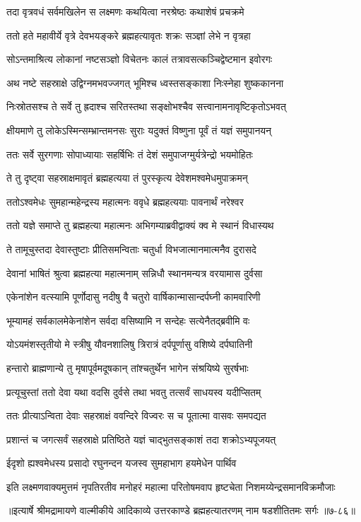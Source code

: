 
\twolineshloka
{तदा वृत्रवधं सर्वमखिलेन स लक्ष्मणः}
{कथयित्वा नरश्रेष्ठः कथाशेषं प्रचक्रमे} %

\twolineshloka
{ततो हते महावीर्ये वृत्रे देवभयङ्करे}
{ब्रह्महत्यावृतः शक्रः सञ्ज्ञां लेभे न वृत्रहा} %

\twolineshloka
{सोऽन्तमाश्रित्य लोकानां नष्टसञ्ज्ञो विचेतनः}
{कालं तत्रावसत्कञ्चिद्वेष्टमान इवोरगः} %

\twolineshloka
{अथ नष्टे सहस्राक्षे उद्विग्नमभवज्जगत्}
{भूमिश्च ध्वस्तसङ्काशा निःस्नेहा शुष्ककानना} %

\twolineshloka
{निःस्रोतसश्च ते सर्वे तु ह्रदाश्च सरितस्तथा}
{सङ्क्षोभश्चैव सत्त्वानामनावृष्टिकृतोऽभवत्} %

\twolineshloka
{क्षीयमाणे तु लोकेऽस्मिन्सम्भ्रान्तमनसः सुराः}
{यदुक्तं विष्णुना पूर्वं तं यज्ञं समुपानयन्} %

\twolineshloka
{ततः सर्वे सुरगणाः सोपाध्यायाः सहर्षिभिः}
{तं देशं समुपाजग्मुर्यत्रेन्द्रो भयमोहितः} %

\twolineshloka
{ते तु दृष्ट्वा सहस्राक्षमावृतं ब्रह्महत्यया}
{तं पुरस्कृत्य देवेशमश्वमेधमुपाक्रमन्} %

\twolineshloka
{ततोऽश्वमेधः सुमहान्महेन्द्रस्य महात्मनः}
{ववृधे ब्रह्महत्ययाः पावनार्थं नरेश्वर} %

\twolineshloka
{ततो यज्ञे समाप्ते तु ब्रह्महत्या महात्मनः}
{अभिगम्याब्रवीद्वाक्यं क्व मे स्थानं विधास्यथ} %

\twolineshloka
{ते तामूचुस्तदा देवास्तुष्टाः प्रीतिसमन्विताः}
{चतुर्धा विभजात्मानमात्मनैव दुरासदे} %

\twolineshloka
{देवानां भाषितं श्रुत्वा ब्रह्महत्या महात्मनाम्}
{सन्निधौ स्थानमन्यत्र वरयामास दुर्वसा} %

\twolineshloka
{एकेनांशेन वत्स्यामि पूर्णोदासु नदीषु वै}
{चतुरो वार्षिकान्मासान्दर्पघ्नी कामवारिणी} %

\twolineshloka
{भूम्यामहं सर्वकालमेकेनांशेन सर्वदा}
{वसिष्यामि न सन्देहः सत्येनैतद्ब्रवीमि वः} %

\twolineshloka
{योऽयमंशस्तृतीयो मे स्त्रीषु यौवनशालिषु}
{त्रिरात्रं दर्पपूर्णासु वशिष्ये दर्पघातिनी} %

\twolineshloka
{हन्तारो ब्राह्मणान्ये तु मृषापूर्वमदूषकान्}
{तांश्चतुर्थेन भागेन संश्रयिष्ये सुरर्षभाः} %

\twolineshloka
{प्रत्यूचुस्तां ततो देवा यथा वदसि दुर्वसे}
{तथा भवतु तत्सर्वं साधयस्व यदीप्सितम्} %

\twolineshloka
{ततः प्रीत्याऽन्विता देवाः सहस्राक्षं ववन्दिरे}
{विज्वरः स च पूतात्मा वासवः समपद्यत} %

\twolineshloka
{प्रशान्तं च जगत्सर्वं सहस्राक्षे प्रतिष्ठिते}
{यज्ञं चाद्भुतसङ्काशं तदा शक्रोऽभ्यपूजयत्} %

\twolineshloka
{ईदृशो ह्यश्वमेधस्य प्रसादो रघुनन्दन}
{यजस्व सुमहाभाग हयमेधेन पार्थिव} %

\twolineshloka
{इति लक्ष्मणवाक्यमुत्तमं नृपतिरतीव मनोहरं महात्मा}
{परितोषमवाप हृष्टचेता निशमय्येन्द्रसमानविक्रमौजाः} %


॥इत्यार्षे श्रीमद्रामायणे वाल्मीकीये आदिकाव्ये उत्तरकाण्डे ब्रह्महत्यातरणम् नाम षडशीतितमः सर्गः ॥७-८६॥
